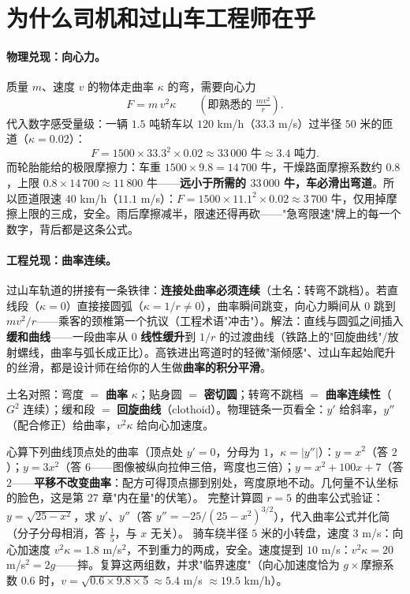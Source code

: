 \section{为什么司机和过山车工程师在乎}

\paragraph{物理兑现：向心力。}质量 $m$、速度 $v$ 的物体走曲率 $\kappa$ 的弯，需要向心力
\[
F = m\,v^2\kappa \qquad (\text{即熟悉的 } \tfrac{mv^2}{r}).
\]
代入数字感受量级：一辆 $1.5$ 吨轿车以 $120$ km/h（$33.3$ m/s）过半径 $50$ 米的匝道（$\kappa = 0.02$）：
\[
F = 1500 \times 33.3^2 \times 0.02 \approx 33\,000 \text{ 牛} \approx 3.4 \text{ 吨力}.
\]
而轮胎能给的极限摩擦力：车重 $1500\times9.8 = 14\,700$ 牛，干燥路面摩擦系数约 $0.8$，上限 $0.8\times14\,700 \approx 11\,800$ 牛——\textbf{远小于所需的 $33\,000$ 牛，车必滑出弯道}。所以匝道限速 $40$ km/h（$11.1$ m/s）：$F = 1500\times11.1^2\times0.02 \approx 3\,700$ 牛，仅用掉摩擦上限的三成，安全。雨后摩擦减半，限速还得再砍——"急弯限速"牌上的每一个数字，背后都是这条公式。

\paragraph{工程兑现：曲率连续。}过山车轨道的拼接有一条铁律：\textbf{连接处曲率必须连续}（土名：转弯不跳档）。若直线段（$\kappa = 0$）直接接圆弧（$\kappa = 1/r \ne 0$），曲率瞬间跳变，向心力瞬间从 $0$ 跳到 $mv^2/r$——乘客的颈椎第一个抗议（工程术语"冲击"）。解法：直线与圆弧之间插入\textbf{缓和曲线}——一段曲率从 $0$ \textbf{线性缓升}到 $1/r$ 的过渡曲线（铁路上的"回旋曲线"/放射螺线，曲率与弧长成正比）。高铁进出弯道时的轻微"渐倾感"、过山车起始爬升的丝滑，都是设计师在给你的人生做\textbf{曲率的积分平滑}。

\begin{cidian}
土名对照：弯度 $=$ \textbf{曲率} $\kappa$；贴身圆 $=$ \textbf{密切圆}；转弯不跳档 $=$ \textbf{曲率连续性}（$G^2$ 连续）；缓和段 $=$ \textbf{回旋曲线}（clothoid）。物理链条一页看全：$y'$ 给斜率，$y''$（配合修正）给曲率，$v^2\kappa$ 给向心加速度。
\end{cidian}

\begin{dongshou}
\begin{itemize}
  \yisi 心算下列曲线顶点处的曲率（顶点处 $y' = 0$，分母为 $1$，$\kappa = |y''|$）：$y = x^2$（答 $2$）；$y = 3x^2$（答 $6$——图像被纵向拉伸三倍，弯度也三倍）；$y = x^2 + 100x + 7$（答 $2$——\textbf{平移不改变曲率}：配方可得顶点挪到别处，弯度原地不动。几何量不认坐标的脸色，这是第 27 章"内在量"的伏笔）。
  \yier 完整计算圆 $r = 5$ 的曲率公式验证：$y = \sqrt{25 - x^2}$，求 $y'$、$y''$（答 $y'' = -25/(25-x^2)^{3/2}$），代入曲率公式并化简（分子分母相消，答 $\tfrac15$，与 $x$ 无关）。
  \yier 骑车绕半径 $5$ 米的小转盘，速度 $3$ m/s：向心加速度 $v^2\kappa = 1.8$ m/s$^2$，不到重力的两成，安全。速度提到 $10$ m/s：$v^2\kappa = 20$ m/s$^2 = 2g$——摔。复算这两组数，并求"临界速度"（向心加速度恰为 $g\times$摩擦系数 $0.6$ 时，$v = \sqrt{0.6\times9.8\times5} \approx 5.4$ m/s $\approx 19.5$ km/h）。
\end{itemize}
\end{dongshou}

